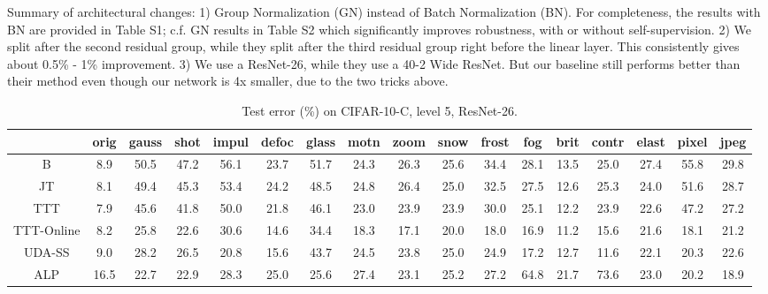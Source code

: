 Summary of architectural changes: 1) Group Normalization (GN) instead of Batch Normalization (BN). For completeness, the results with BN are provided in Table S1; c.f. GN results in Table S2 which significantly improves robustness, with or without self-supervision. 2) We split after the second residual group, while they split after the third residual group right before the linear layer. This consistently gives about 0.5\% - 1\% improvement. 3) We use a ResNet-26, while they use a 40-2 Wide ResNet. But our baseline still performs better than their method even though our network is 4x smaller, due to the two tricks above.

\newpage
\begin{table}[ht]
	\footnotesize
	\begin{center}
		{
			\setlength\tabcolsep{3.5pt}
			\begin{tabular}{c|c|c|c|c|c|c|c|c|c|c|c|c|c|c|c|c}
				\hline
				& orig& gauss& shot& impul& defoc& glass& motn& zoom& snow& frost& fog& brit& contr& elast& pixel& jpeg\\
				\hline
				B & 8.9& 50.5& 47.2& 56.1& 23.7& 51.7& 24.3& 26.3& 25.6& 34.4& 28.1& 13.5& 25.0& 27.4& 55.8& 29.8\\
				\hline
				JT & 8.1& 49.4& 45.3& 53.4& 24.2& 48.5& 24.8& 26.4& 25.0& 32.5& 27.5& 12.6& 25.3& 24.0& 51.6& 28.7\\
				\hline
				TTT & 7.9& 45.6& 41.8& 50.0& 21.8& 46.1& 23.0& 23.9& 23.9& 30.0& 25.1& 12.2& 23.9& 22.6& 47.2& 27.2\\
				\hline
				TTT-Online & 8.2& 25.8& 22.6& 30.6& 14.6& 34.4& 18.3& 17.1& 20.0& 18.0& 16.9& 11.2& 15.6& 21.6& 18.1& 21.2\\
				\hline
				UDA-SS & 9.0& 28.2& 26.5& 20.8& 15.6& 43.7& 24.5& 23.8& 25.0& 24.9& 17.2& 12.7& 11.6& 22.1& 20.3& 22.6\\
				\hline
				ALP & 16.5& 22.7& 22.9& 28.3& 25.0& 25.6& 27.4& 23.1& 25.2& 27.2& 64.8& 21.7& 73.6& 23.0& 20.2& 18.9\\
				\hline
			\end{tabular}
		}
	\end{center}
	\vspace{-2ex}
	\caption{
		Test error (\%) on CIFAR-10-C, level 5, ResNet-26.
	}
\label{table:full_c10c}
\end{table} 

